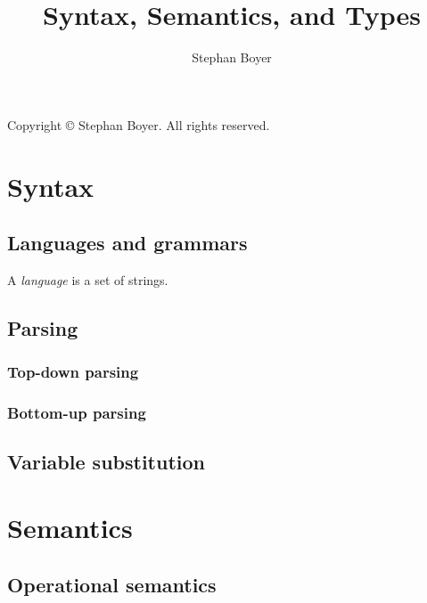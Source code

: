 \documentclass[ebook,oneside]{memoir}
\title{Syntax, Semantics, and Types}
\author{Stephan Boyer}
\date{}
\begin{document}
  

  \frontmatter

  

  \pagebreak
  \hspace{0pt}
  \vfill
    \begin{center}
      Copyright \copyright{} \the\year{} Stephan Boyer. All rights reserved.
    \end{center}
  \vfill
  \hspace{0pt}
  \pagebreak

  

  \cleardoublepage
  \tableofcontents

  \mainmatter


  \part{Syntax}

    \chapter{Languages and grammars}

      A \emph{language} is a set of strings.

    \chapter{Parsing}

      \section{Top-down parsing}

      \section{Bottom-up parsing}

    \chapter{Variable substitution}

  \part{Semantics}

    \chapter{Operational semantics}
\end{document}

